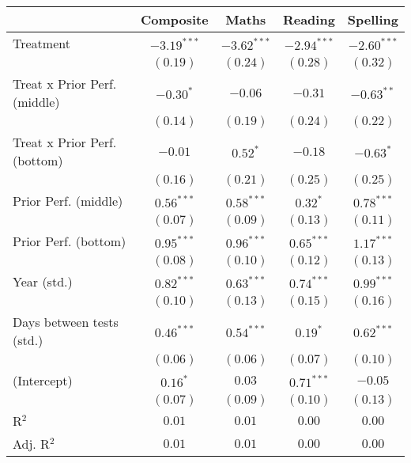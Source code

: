 
\begin{table}
\begin{center}
\begin{tabular}{l c c c c}
\hline
 & Composite & Maths & Reading & Spelling \\
\hline
Treatment                    & $-3.19^{***}$ & $-3.62^{***}$ & $-2.94^{***}$ & $-2.60^{***}$ \\
                             & $(0.19)$      & $(0.24)$      & $(0.28)$      & $(0.32)$      \\
Treat x Prior Perf. (middle) & $-0.30^{*}$   & $-0.06$       & $-0.31$       & $-0.63^{**}$  \\
                             & $(0.14)$      & $(0.19)$      & $(0.24)$      & $(0.22)$      \\
Treat x Prior Perf. (bottom) & $-0.01$       & $0.52^{*}$    & $-0.18$       & $-0.63^{*}$   \\
                             & $(0.16)$      & $(0.21)$      & $(0.25)$      & $(0.25)$      \\
Prior Perf. (middle)         & $0.56^{***}$  & $0.58^{***}$  & $0.32^{*}$    & $0.78^{***}$  \\
                             & $(0.07)$      & $(0.09)$      & $(0.13)$      & $(0.11)$      \\
Prior Perf. (bottom)         & $0.95^{***}$  & $0.96^{***}$  & $0.65^{***}$  & $1.17^{***}$  \\
                             & $(0.08)$      & $(0.10)$      & $(0.12)$      & $(0.13)$      \\
Year (std.)                  & $0.82^{***}$  & $0.63^{***}$  & $0.74^{***}$  & $0.99^{***}$  \\
                             & $(0.10)$      & $(0.13)$      & $(0.15)$      & $(0.16)$      \\
Days between tests (std.)    & $0.46^{***}$  & $0.54^{***}$  & $0.19^{*}$    & $0.62^{***}$  \\
                             & $(0.06)$      & $(0.06)$      & $(0.07)$      & $(0.10)$      \\
(Intercept)                  & $0.16^{*}$    & $0.03$        & $0.71^{***}$  & $-0.05$       \\
                             & $(0.07)$      & $(0.09)$      & $(0.10)$      & $(0.13)$      \\
\hline
R$^2$                        & $0.01$        & $0.01$        & $0.00$        & $0.00$        \\
Adj. R$^2$                   & $0.01$        & $0.01$        & $0.00$        & $0.00$        \\

\end{tabular}
\end{center}
\end{table}
